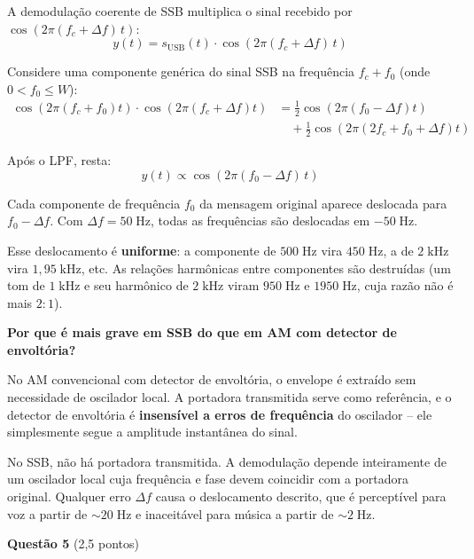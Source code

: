 \documentclass[11pt,a4paper]{article}
\begin{document}
\begin{resolucao}

A demodulação coerente de SSB multiplica o sinal recebido por $\cos(2\pi(f_c + \Delta f)\,t)$:
\[
  y(t) = s_{\text{USB}}(t) \cdot \cos(2\pi(f_c + \Delta f)\,t)
\]

Considere uma componente genérica do sinal SSB na frequência $f_c + f_0$ (onde $0 < f_0 \leq W$):
\begin{align*}
  \cos(2\pi(f_c + f_0)t) \cdot \cos(2\pi(f_c + \Delta f)t) &= \frac{1}{2}\cos(2\pi(f_0 - \Delta f)t) \\
  &\quad + \frac{1}{2}\cos(2\pi(2f_c + f_0 + \Delta f)t)
\end{align*}

Após o LPF, resta:
\[
  \boxed{y(t) \propto \cos(2\pi(f_0 - \Delta f)\,t)}
\]

Cada componente de frequência $f_0$ da mensagem original aparece deslocada para $f_0 - \Delta f$. Com $\Delta f = 50\;\text{Hz}$, todas as frequências são deslocadas em $-50\;\text{Hz}$.

Esse deslocamento é \textbf{uniforme}: a componente de $500\;\text{Hz}$ vira $450\;\text{Hz}$, a de $2\;\text{kHz}$ vira $1{,}95\;\text{kHz}$, etc. As relações harmônicas entre componentes são destruídas (um tom de $1\;\text{kHz}$ e seu harmônico de $2\;\text{kHz}$ viram $950\;\text{Hz}$ e $1950\;\text{Hz}$, cuja razão não é mais $2{:}1$).

\textbf{Por que é mais grave em SSB do que em AM com detector de envoltória?}

No AM convencional com detector de envoltória, o envelope é extraído sem necessidade de oscilador local. A portadora transmitida serve como referência, e o detector de envoltória é \textbf{insensível a erros de frequência} do oscilador -- ele simplesmente segue a amplitude instantânea do sinal.

No SSB, não há portadora transmitida. A demodulação depende inteiramente de um oscilador local cuja frequência e fase devem coincidir com a portadora original. Qualquer erro $\Delta f$ causa o deslocamento descrito, que é perceptível para voz a partir de $\sim 20\;\text{Hz}$ e inaceitável para música a partir de $\sim 2\;\text{Hz}$.
\end{resolucao}


\textbf{Questão 5} \hfill (2{,}5 pontos)
\end{document}
